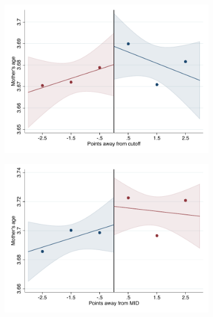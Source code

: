 \documentclass[oneside,11pt]{article}
\begin{document}
\begin{figure}[H]

    \ContinuedFloat
    \caption{(Continued) RD plots for balance variables across those assigned to either UNAM or IPN high-school, and those who are not\label{fig:Balance_rd_plot_elite_3}}
    \begin{center}

    \begin{subfigure}{0.475\textwidth}
        \centering
        \includegraphics[width=\textwidth]{04_Figures/rd_plot_tau_edad_mad_pdelta3.pdf}
    \end{subfigure}
    \begin{subfigure}{0.475\textwidth}
        \centering
        \includegraphics[width=\textwidth]{04_Figures/rd_plot_mid_edad_mad_pdelta3.pdf}
    \end{subfigure}
    \end{center}
    

\end{figure}
\end{document}
